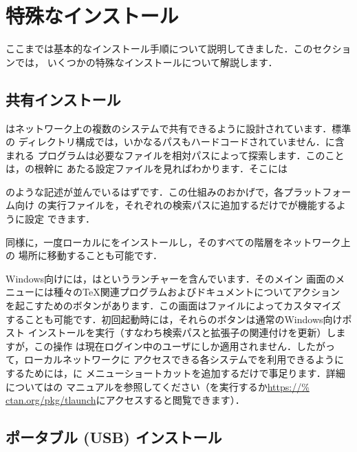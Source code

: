 \documentclass[uplatex,dvipdfmx,tombow]{jsarticle}
\begin{document}
\section{特殊なインストール}

ここまでは基本的なインストール手順について説明してきました．このセクションでは，
いくつかの特殊なインストールについて解説します．

\subsection{共有インストール}
\label{sec:sharedinstall}

\TL はネットワーク上の複数のシステムで共有できるように設計されています．標準の
ディレクトリ構成では，いかなるパスもハードコードされていません．\TL に含まれる
プログラムは必要なファイルを相対パスによって探索します．このことは，\TL の根幹に
あたる設定ファイルを見ればわかります．そこには
%
%
のような記述が並んでいるはずです．この仕組みのおかげで，各プラットフォーム向け
の実行ファイルを，それぞれの検索パスに追加するだけで\TL が機能するように設定
できます．

同様に，一度ローカルに\TL をインストールし，そのすべての階層をネットワーク上の
場所に移動することも可能です．

Windows向けには，\TL はというランチャーを含んでいます．そのメイン
画面のメニューには種々の\TeX 関連プログラムおよびドキュメントについてアクション
を起こすためのボタンがあります．この画面はファイルによってカスタマイズ
することも可能です．初回起動時には，それらのボタンは通常のWindows向けポスト
インストールを実行（すなわち検索パスと拡張子の関連付けを更新）しますが，この操作
は現在ログイン中のユーザにしか適用されません．したがって，ローカルネットワークに
アクセスできる各システムで\TL を利用できるようにするためには，に
メニューショートカットを追加するだけで事足ります．詳細についてはの
マニュアルを参照してください（を実行するか\url{https://%
ctan.org/pkg/tlaunch}にアクセスすると閲覧できます）．

\subsection{ポータブル (USB) インストール}
\label{sec:portable-tl}
\end{document}
